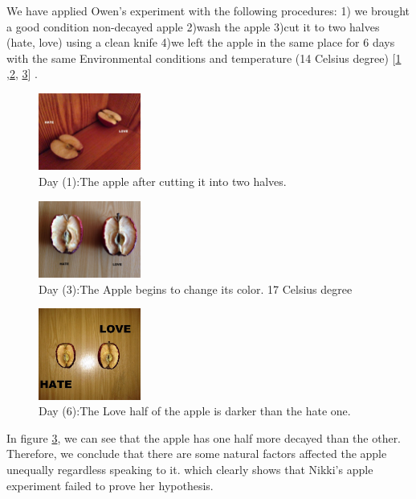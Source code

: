 \documentclass[12pt]{article}
\theoremstyle{plain}
\theoremstyle{definition}
\theoremstyle{remark}
\begin{document}
We have applied Owen's experiment with the following procedures: 1) we brought a good condition non-decayed apple 2)wash the apple 3)cut it to two halves (hate, love) using a clean knife 4)we left the apple in the same place for 6 days with the same Environmental conditions and temperature (14 Celsius degree)  [\ref{fig:apple1} ,\ref{fig:apple2}, \ref{fig:apple3}] .

\begin{figure}[hbtp]
	 \centerline{\includegraphics[width=0.3\textwidth]{apple1.jpg}}
	 {\caption{Day (1):The apple after cutting it into two halves.}\label{fig:apple1}}
\end{figure}

\begin{figure}[hbtp]
	 \centerline{\includegraphics[width=0.3\textwidth]{apple2.jpg}}
	 {\caption{Day (3):The Apple begins to change its color. 17 Celsius degree}\label{fig:apple2}}
\end{figure}

\begin{figure}[hbtp]
	 \centerline{\includegraphics[width=0.3\textwidth]{apple3.jpg}}
	 {\caption{Day (6):The Love half of the apple is darker than the hate one.}\label{fig:apple3}}
\end{figure}

In figure \ref{fig:apple3}, we can see that the apple has one half more decayed than the other. Therefore, we conclude that there are some natural factors affected the apple unequally regardless speaking to it. which clearly shows that Nikki's apple experiment failed to prove her hypothesis. 
\end{document}

